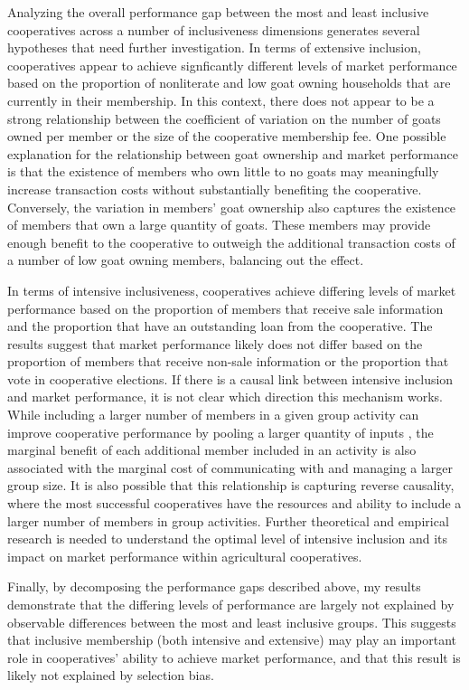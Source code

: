 \documentclass[11pt]{article}
\begin{document}
Analyzing the overall performance gap between the most and least inclusive cooperatives across a number of inclusiveness dimensions generates several hypotheses that need further investigation. In terms of extensive inclusion, cooperatives appear to achieve signficantly different levels of market performance based on the proportion of nonliterate and low goat owning households that are currently in their membership. In this context, there does not appear to be a strong relationship between the coefficient of variation on the number of goats owned per member or the size of the cooperative membership fee. One possible explanation for the relationship between goat ownership and market performance is that the existence of members who own little to no goats may meaningfully increase transaction costs without substantially benefiting the cooperative. Conversely, the variation in members' goat ownership also captures the existence of members that own a large quantity of goats. These members may provide enough benefit to the cooperative to outweigh the additional transaction costs of a number of low goat owning members, balancing out the effect. 

In terms of intensive inclusiveness, cooperatives achieve differing levels of market performance based on the proportion of members that receive sale information and the proportion that have an outstanding loan from the cooperative. The results suggest that market performance likely does not differ based on the proportion of members that receive non-sale information or the proportion that vote in cooperative elections. If there is a causal link between intensive inclusion and market performance, it is not clear which direction this mechanism works. While including a larger number of members in a given group activity can improve cooperative performance by pooling a larger quantity of inputs \citep{aflagah_cheap_2019}, the marginal benefit of each additional member included in an activity is also associated with the marginal cost of communicating with and managing a larger group size. It is also possible that this relationship is capturing reverse causality, where the most successful cooperatives have the resources and ability to include a larger number of members in group activities. Further theoretical and empirical research is needed to understand the optimal level of intensive inclusion and its impact on market performance within agricultural cooperatives.

Finally, by decomposing the performance gaps described above, my results demonstrate that the differing levels of performance are largely not explained by observable differences between the most and least inclusive groups. This suggests that inclusive membership (both intensive and extensive) may play an important role in cooperatives' ability to achieve market performance, and that this result is likely not explained by selection bias. %
\end{document}
